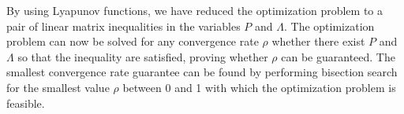 By using Lyapunov functions, we have reduced the optimization problem to a pair of linear matrix inequalities in the variables $P$ and $\Lambda$. The optimization problem can now be solved for any convergence rate $\rho$ whether there exist $P$ and $\Lambda $ so that the inequality are satisfied, proving whether $\rho$ can be guaranteed. The smallest convergence rate guarantee can be found by performing bisection search for the smallest value $\rho$ between 0 and 1 with which the optimization problem is feasible.










